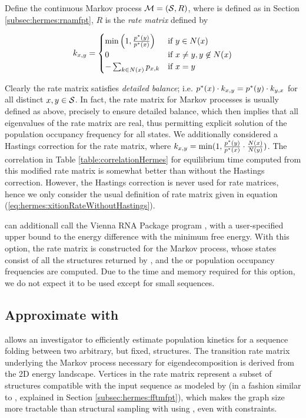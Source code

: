 Define the continuous Markov process
$\mathcal{M}=(\mathcal S,R)$, where \str is defined as in Section
\ref{subsec:hermes:rnamfpt}, $R$ is the {\em rate matrix} defined by

\begin{align}
\label{eq:hermes:xitionRateWithoutHastings}
k_{x,y}=
\begin{cases}
\min\left(1, \frac{\pSt(y)}{\pSt(x)}\right)
& \text{if $y \in N(x)$} \\
0 &\text{if $x \ne y, y \not\in N(x)$} \\
- \sum_{k \in N(x)} p_{x,k} & \text{if $x=y$} \\
\end{cases}
\end{align}

Clearly the rate matrix satisfies {\em detailed balance}; i.e. $p^*(x)
\cdot k_{x,y} = p^*(y) \cdot k_{y,x}$ for all distinct $x,y \in
\mathcal S$. In fact, the rate matrix for Markov processes is usually
defined as above, precisely to ensure detailed balance, which then
implies that all eigenvalues of the rate matrix are real, thus
permitting explicit solution of the population occupancy frequency for
all states. We additionally considered a Hastings correction
for the rate matrix, where $k_{x,y} = \min(1, \frac{p^*(y)}{p^*(x)}
\cdot \frac{N(x)}{N(y)})$. The correlation in
Table \ref{table:correlationHermes} for equilibrium time computed from this
modified rate matrix is somewhat better than without the Hastings
correction. However, the Hastings correction is never used for rate
matrices, hence we only consider the usual definition of rate matrix
given in equation (\ref{eq:hermes:xitionRateWithoutHastings}).

\rnaeq can additionall call the
Vienna RNA Package program \rnasub \cite{Wuchty.b99}, with a
user-specified upper bound to the energy difference with the minimum
free energy. With this option, the rate matrix is
constructed for the Markov process, whose states consist of all
the structures returned by \rnasub, and the \eqt or
population occupancy frequencies are computed. Due to the time
and memory required for this option, we do not expect it to be used except for
small sequences.

\subsection{Approximate \eqt with \ffteq}
\label{subsec:hermes:ffteq}

\ffteq allows an investigator to efficiently estimate population
kinetics for a sequence folding between two arbitrary, but fixed,
structures. The transition rate matrix underlying the Markov process
necessary for eigendecomposition is derived from the 2D energy
landscape. Vertices in the rate matrix represent a subset of
structures compatible with the input sequence as modeled by
\ffttwo (in a fashion similar to \fftmfpt, explained in Section
\ref{subsec:hermes:fftmfpt}), which makes the graph size more tractable
than structural
sampling with \rnasub using \rnaeq, even with constraints.

